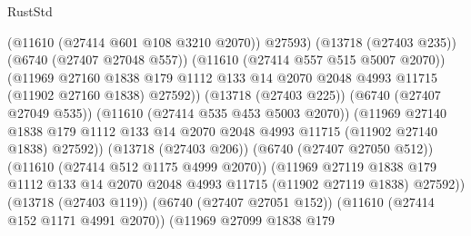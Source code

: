 \begin{lexlean}{RustStd}
\begin{coremodule}
                                    (@11610 (@27414 @601 @108 @3210 @2070))
                                    @27593)
                                  (@13718 (@27403 @235))
                                  (@6740 (@27407 @27048 @557))
                                  (@11610 (@27414 @557 @515 @5007 @2070))
                                  (@11969
                                    @27160
                                    @1838
                                    @179
                                    @1112
                                    @133
                                    @14
                                    @2070
                                    @2048
                                    @4993
                                    @11715
                                    (@11902 @27160 @1838)
                                    @27592))
                                (@13718 (@27403 @225))
                                (@6740 (@27407 @27049 @535))
                                (@11610 (@27414 @535 @453 @5003 @2070))
                                (@11969
                                  @27140
                                  @1838
                                  @179
                                  @1112
                                  @133
                                  @14
                                  @2070
                                  @2048
                                  @4993
                                  @11715
                                  (@11902 @27140 @1838)
                                  @27592))
                              (@13718 (@27403 @206))
                              (@6740 (@27407 @27050 @512))
                              (@11610 (@27414 @512 @1175 @4999 @2070))
                              (@11969
                                @27119
                                @1838
                                @179
                                @1112
                                @133
                                @14
                                @2070
                                @2048
                                @4993
                                @11715
                                (@11902 @27119 @1838)
                                @27592))
                            (@13718 (@27403 @119))
                            (@6740 (@27407 @27051 @152))
                            (@11610 (@27414 @152 @1171 @4991 @2070))
                            (@11969
                              @27099
                              @1838
                              @179

\end{coremodule}
\end{lexlean}
